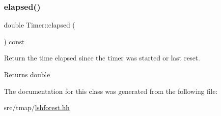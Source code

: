 \subsubsection{\texorpdfstring{elapsed()}{elapsed()}}
{\footnotesize\ttfamily double Timer\+::elapsed (\begin{DoxyParamCaption}{ }\end{DoxyParamCaption}) const\hspace{0.3cm}{\ttfamily [inline]}}



Return the time elapsed since the timer was started or last reset. 

\begin{DoxyReturn}{Returns}
double 
\end{DoxyReturn}


The documentation for this class was generated from the following file\+:\begin{DoxyCompactItemize}
\item 
src/tmap/\hyperlink{lshforest_8hh}{lshforest.\+hh}\end{DoxyCompactItemize}
